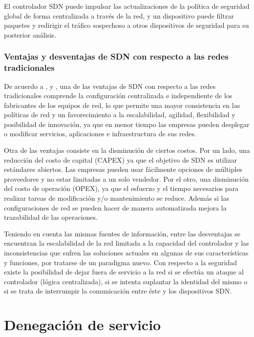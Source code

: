 El controlador SDN puede impulsar las actualizaciones de la política de
seguridad global de forma centralizada a través de la red, y un dispositivo
puede filtrar paquetes y redirigir el tráfico sospechoso a otros dispositivos de
seguridad para su posterior análisis.

\subsubsection*{Ventajas y desventajas de SDN con respecto a las redes tradicionales}
De acuerdo a \parencite{RFC7149}, \parencite{sdn_universidad} y
\parencite{sdn_approach}, una de las ventajas de SDN con respecto a las redes
tradicionales comprende la configuración centralizada e independiente de los
fabricantes de los equipos de red, lo que permite una mayor consistencia en las
políticas de red y un favorecimiento a la escalabilidad, agilidad, flexibilidad
y posibilidad de innovación, ya que en menor tiempo las empresas pueden
desplegar o modificar servicios, aplicaciones e infraestructura de sus redes. 


Otra de las ventajas consiste en la disminución de ciertos costos. Por un lado,
una reducción del costo de capital (CAPEX) ya que el objetivo de SDN es utilizar
estándares abiertos. Las empresas pueden usar fácilmente opciones de múltiples
proveedores y no estar limitadas a un solo vendedor. Por el otro, una disminución
del costo de operación (OPEX), ya que el esfuerzo y el tiempo necesarios para
realizar tareas de modificación y/o mantenimiento se reduce. Además si las
configuraciones de red se pueden hacer de manera automatizada mejora la
trazabilidad de las operaciones.

Teniendo en cuenta las mismas fuentes de información, entre las
desventajas se encuentran la escalabilidad de la red limitada a la capacidad del
controlador y las inconsistencias que sufren las soluciones actuales en algunas de
sus características y funciones, por tratarse de un paradigma nuevo. Con respecto 
a la seguridad existe la posibilidad de dejar fuera de servicio a la red si se 
efectúa un ataque al controlador (lógica centralizada), si se intenta suplantar 
la identidad del mismo o si se trata de interrumpir la comunicación entre éste y 
los dispositivos SDN.


\section {Denegación de servicio}	

